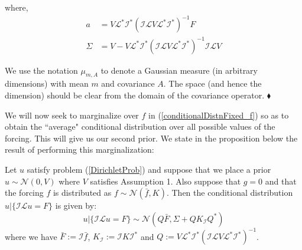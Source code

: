 where,
\begin{align}
    \label{post_mean_before_averaging}
    a &= V\mathcal{L}^{*}\mathcal{I}^{*}(\mathcal{I}\mathcal{L}V\mathcal{L}^{*}\mathcal{I}^{*})^{-1}F \\
    \label{post_var_before_averaging}
    \Sigma &= V - V\mathcal{L}^{*}\mathcal{I}^{*}(\mathcal{I}\mathcal{L}V\mathcal{L}^{*}\mathcal{I}^{*})^{-1}\mathcal{I}\mathcal{L}V
\end{align}
\begin{remark}
We use the notation $\mu_{m,A}$ to denote a Gaussian measure (in arbitrary dimensions) with mean $m$ and covariance $A$. The space (and hence the dimension) should be clear from the domain of the covariance operator.
$\mathbin{\blacklozenge}$
\end{remark}

We will now seek to marginalize over $f$ in (\ref{conditionalDistnFixed_f}) so as to obtain the ``average" conditional distribution over all possible values of the forcing. This will give us our second prior. We state in the proposition below the result of performing this marginalization: \vspace{5pt}

\begin{proposition}
    \label{first_prop}
    Let $u$ satisfy problem (\ref{DirichletProb}) and suppose that we place a prior $u\sim\mathcal{N}(0,V)$ where $V$ satisfies Assumption 1. Also suppose that $g=0$ and that the forcing $f$ is distributed as $f\sim\mathcal{N}(\bar{f},K)$. Then the conditional distribution $u|\{\mathcal{I}\mathcal{L}u=F\}$ is given by:
    \begin{equation}
        \label{approx_prior}
        u|\{\mathcal{I}\mathcal{L}u=F\}\sim\mathcal{N}(Q\bar{F},\Sigma+QK_{\mathcal{I}}Q^{*})
    \end{equation}
    where we have $\bar{F}:=\mathcal{I}\bar{f}$, $K_{\mathcal{I}}:=\mathcal{I}K\mathcal{I}^{*}$ and $Q:=V\mathcal{L}^{*}\mathcal{I}^{*}(\mathcal{I}\mathcal{L}V\mathcal{L}^{*}\mathcal{I}^{*})^{-1}$.
\end{proposition}

